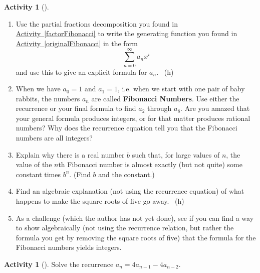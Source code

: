 \documentclass[10pt,]{book}
\newcommand{\terminology}[1]{\textbf{#1}}
\theoremstyle{plain}
\theoremstyle{definition}
\theoremstyle{definition}
\theoremstyle{definition}
\newtheorem{activity}[project]{Activity}
\numberwithin{equation}{chapter}
\begin{document}
\begin{activity}[]\label{solveFibonacci}
\leavevmode%
\begin{enumerate}[font=\bfseries,label=(\alph*),ref=\alph*]
\item\label{task-247} \hypertarget{p-1370}{}%
Use the partial fractions decomposition you found in \hyperref[factorFibonacci]{Activity~\ref{factorFibonacci}} to write the generating function you found in \hyperref[originalFibonacci]{Activity~\ref{originalFibonacci}} in the form%
\begin{equation*}
\sum_{n=0}^\infty a_nx^i
\end{equation*}
and use this to give an explicit formula for \(a_n\).%
~{\tiny (h)}\item\label{task-248} \hypertarget{p-1373}{}%
When we have \(a_0=1\) and \(a_1=1\), i.e. when we start with one pair of baby rabbits, the numbers \(a_n\) are called \terminology{Fibonacci Numbers}.  Use either the recurrence or your final formula to find \(a_2\) through \(a_8\).  Are you amazed that your general formula produces integers, or for that matter produces rational numbers?  Why does the recurrence equation tell you that the Fibonacci numbers are all integers?%
\item\label{task-249} \hypertarget{p-1375}{}%
Explain why there is a real number \(b\) such that, for large values of \(n\), the value of the \(n\)th Fibonacci number is almost exactly (but not quite) some constant times \(b^n\). (Find \(b\) and the constant.)%
\item\label{task-250} \hypertarget{p-1377}{}%
Find an algebraic explanation (not using the recurrence equation) of what happens to make the square roots of five go away.%
~{\tiny (h)}\item\label{task-251} \hypertarget{p-1380}{}%
As a challenge (which the author has not yet done), see if you can find a way to show algebraically (not using the recurrence relation, but rather the formula you get by removing the square roots of five) that the formula for the Fibonacci numbers yields integers.%
\end{enumerate}
\end{activity}
\begin{activity}[]\label{activity-263}
\hypertarget{p-1382}{}%
Solve the recurrence \(a_n= 4a_{n-1} - 4a_{n-2}\).%
\end{activity}
\typeout{************************************************}
\typeout{************************************************}
\end{document}
